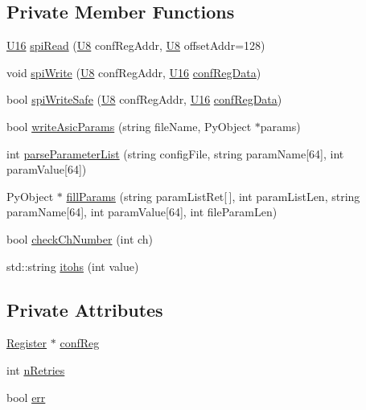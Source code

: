 \subsection*{Private Member Functions}
\begin{DoxyCompactItemize}
\item 
\hyperlink{ICECALv3_8h_adf928e51a60dba0df29d615401cc55a8}{U16} \hyperlink{classICECALv3_aced41ce20a0853d6248b8df88412e57a}{spi\+Read} (\hyperlink{ICECALv3_8h_a3cb25ca6f51f003950f9625ff05536fc}{U8} conf\+Reg\+Addr, \hyperlink{ICECALv3_8h_a3cb25ca6f51f003950f9625ff05536fc}{U8} offset\+Addr=128)
\item 
void \hyperlink{classICECALv3_aef00f02801dea4bda2093c930501dcdd}{spi\+Write} (\hyperlink{ICECALv3_8h_a3cb25ca6f51f003950f9625ff05536fc}{U8} conf\+Reg\+Addr, \hyperlink{ICECALv3_8h_adf928e51a60dba0df29d615401cc55a8}{U16} \hyperlink{structconfRegData}{conf\+Reg\+Data})
\item 
bool \hyperlink{classICECALv3_aa0b8358ea0be8e47a8aded5e1551787f}{spi\+Write\+Safe} (\hyperlink{ICECALv3_8h_a3cb25ca6f51f003950f9625ff05536fc}{U8} conf\+Reg\+Addr, \hyperlink{ICECALv3_8h_adf928e51a60dba0df29d615401cc55a8}{U16} \hyperlink{structconfRegData}{conf\+Reg\+Data})
\item 
bool \hyperlink{classICECALv3_a9d7c33e6d113e7f721dc848d28ab44d8}{write\+Asic\+Params} (string file\+Name, Py\+Object $\ast$params)
\item 
int \hyperlink{classICECALv3_a313e8166af1ce26b4026f883ad900fb9}{parse\+Parameter\+List} (string config\+File, string param\+Name\mbox{[}64\mbox{]}, int param\+Value\mbox{[}64\mbox{]})
\item 
Py\+Object $\ast$ \hyperlink{classICECALv3_ac006abc42a048308427f6801d783a407}{fill\+Params} (string param\+List\+Ret\mbox{[}$\,$\mbox{]}, int param\+List\+Len, string param\+Name\mbox{[}64\mbox{]}, int param\+Value\mbox{[}64\mbox{]}, int file\+Param\+Len)
\item 
bool \hyperlink{classICECALv3_a8753a74558f988b346a3fe350c5bbad4}{check\+Ch\+Number} (int ch)
\item 
std\+::string \hyperlink{classICECALv3_a04b02e583f191bfce34d05132cd23834}{itohs} (int value)
\end{DoxyCompactItemize}
\subsection*{Private Attributes}
\begin{DoxyCompactItemize}
\item 
\hyperlink{classRegister}{Register} $\ast$ \hyperlink{classICECALv3_a6e8b6c03f5b0f1d8281bf8a0fa46064f}{conf\+Reg}
\item 
int \hyperlink{classICECALv3_ae877ce34b3a4d6c368cc6409ac9614fa}{n\+Retries}
\item 
bool \hyperlink{classICECALv3_ad8989925ee5b3ff322d863ce6aaff0bd}{err}
\end{DoxyCompactItemize}


